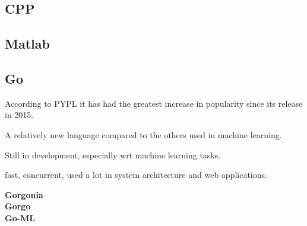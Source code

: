 \subsection{CPP}

\subsection{Matlab}

\subsection{Go}
According to PYPL it has had the greatest increase in popularity since its release in 2015.

A relatively new language compared to the others used in machine learning.

Still in development, especially wrt machine learning tasks.\

fast, concurrent, used a lot in system architecture and web applications.

\textbf{Gorgonia}\\
\textbf{Gorgo}\\
\textbf{Go-ML}\\


